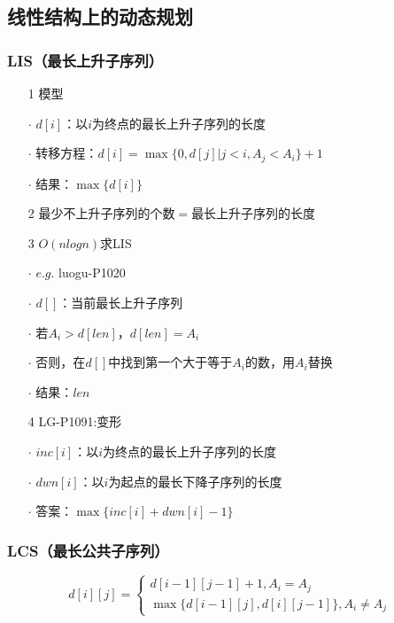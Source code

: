 \subsection{线性结构上的动态规划}
\subsubsection{LIS（最长上升子序列）}
\begin{itemize}
	\item[1] 模型
		\item[$\cdot$] $d[i]$：以$i$为终点的最长上升子序列的长度
		\item[$\cdot$] 转移方程：$d[i]=\max\{0,d[j]|j<i,A_j<A_i\}+1$
		\item[$\cdot$] 结果：$\max \{ d[i]\}$
	\item[2] 最少不上升子序列的个数$=$最长上升子序列的长度
	\item[3] $O(nlogn)$求LIS
		\item[$\cdot$] $e.g.$ luogu-P1020
		\item[$\cdot$] $d[]$：当前最长上升子序列
		\item[$\cdot$] 若$A_i>d[len]$，$d[len]=A_i$
		\item[$\cdot$] 否则，在$d[]$中找到第一个大于等于$A_i$的数，用$A_i$替换
		\item[$\cdot$] 结果：$len$
	\item[4] LG-P1091:变形
		\item[$\cdot$] $inc[i]$：以$i$为终点的最长上升子序列的长度
		\item[$\cdot$] $dwn[i]$：以$i$为起点的最长下降子序列的长度
		\item[$\cdot$] 答案：$\max\{inc[i]+dwn[i]-1\}$
\end{itemize}
\subsubsection{LCS（最长公共子序列）}
\begin{equation*}
	d[i][j]=
	\left\{
	\begin{array}{rcl}
	d[i-1][j-1]+1,A_i=A_j\\
	\max \{d[i-1][j],d[i][j-1]\},A_i\neq A_j
	\end{array} \right.
\end{equation*}